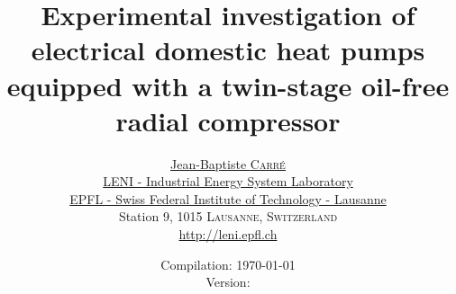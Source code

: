 \documentclass[english,10pt,a4paper,twoside,fleqn]{book}
\makeatletter
\newcommand{\vartitle}{Experimental investigation of electrical
  domestic heat pumps equipped with a twin-stage oil-free radial
  compressor}
\newcommand{\varauthor}{\href{http://people.epfl.ch/jean-baptiste.carre}{Jean-Baptiste
    \textsc{Carr\'e}}
  \href{mailto:jean-baptiste.carre@epfl.ch}{\Email}}
\newcommand{\varinstitute}{\href{http://leni.epfl.ch/}{LENI - Industrial Energy System Laboratory}\\
  \href{http://leni.epfl.ch/}{EPFL - Swiss Federal Institute of Technology - Lausanne}\\
  Station 9, 1015 \textsc{Lausanne}, \textsc{Switzerland}\\[3mm]
  \href{http://leni.epfl.ch/}{http://leni.epfl.ch}}
\newcommand{\vardate}{Compilation: \today\\
  Version: }
\makeatother
\begin{document}
\title{\vartitle}

\author{\varauthor\\[5mm]\varinstitute}

\date{\vardate}

\maketitle


\frontmatter






% 
% 

% 

\cleardoublepage
\newpage
{}
\tableofcontents

\cleardoublepage
\newpage
{}
\listoffigures

\cleardoublepage
\newpage
{}
\listoftables

\cleardoublepage
\newpage
{}
\printnomenclature

\cleardoublepage
\newpage
{}
\label{glossary}
\printglossary


\mainmatter

\fancyhead[LO,RE]{\leftmark}















\fancyhead[LO,RE]{}
\end{document}
